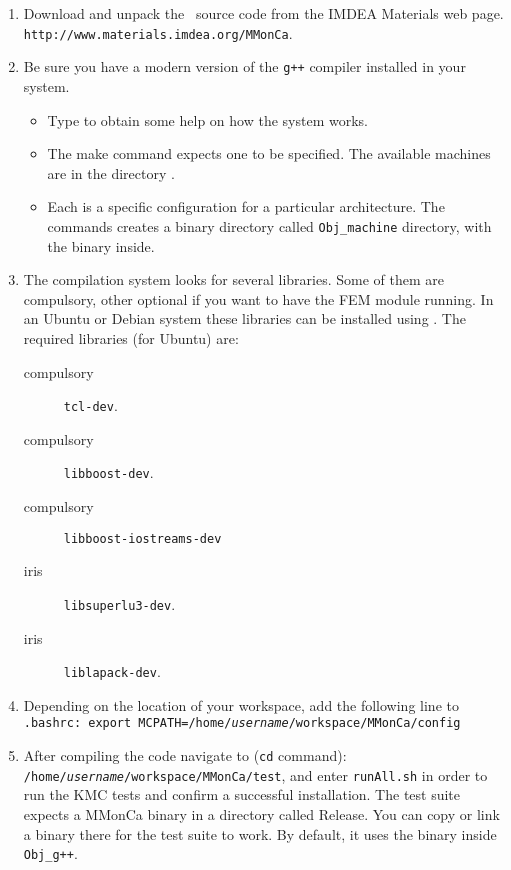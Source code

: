 \begin{enumerate}
 \item Download and unpack the \MMonCa\ source code from the IMDEA Materials web page. {\tt http://www.materials.imdea.org/MMonCa}.
 \item Be sure you have a modern version of the {\tt g++} compiler installed in your system. 
\begin{itemize}
\item Type  to obtain some help on how the  system works.
\item The make command expects one  to be specified. The available machines are in the directory .
\item Each  is a specific configuration for a particular architecture. The  commands creates a binary directory called {\tt Obj\verb+_+machine} directory, with the  binary inside.
\end{itemize}
\item The compilation system looks for several libraries. Some of them are compulsory, other optional if you want to have the  FEM module running. In an Ubuntu or Debian system these libraries can be installed using . The required libraries (for Ubuntu) are:
\begin{description}
\item[compulsory] {\tt tcl-dev}.
\item[compulsory] {\tt libboost-dev}.
\item[compulsory] {\tt libboost-iostreams-dev}
\item[iris] {\tt libsuperlu3-dev}.
\item[iris] {\tt liblapack-dev}.
\end{description}
 \item Depending on the location of your workspace, add the following line to {\tt .bashrc: export MCPATH=/home/\textit{username}/workspace/MMonCa/config}
 \item After compiling the code navigate to ({\tt cd} command): \\
{\tt /home/\textit{username}/workspace/MMonCa/test}, and enter {\tt runAll.sh} in order to run the KMC tests and confirm a successful installation. The test suite expects a MMonCa binary in a directory called Release. You can copy or link a binary there for the test suite to work. By default, it uses the binary inside \verb-Obj_g++-.
\end{enumerate}



